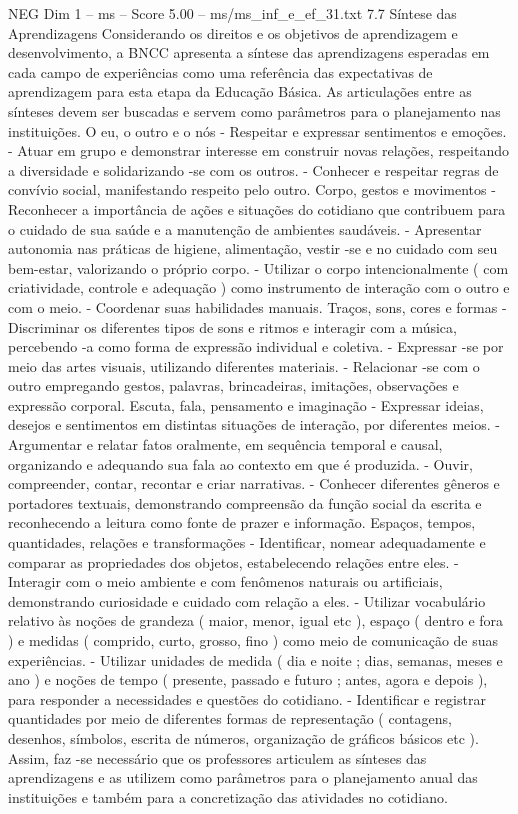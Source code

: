 \begin{textsample}{NEG Dim 1 – ms – Score 5.00 – ms/ms\_inf\_e\_ef\_31.txt}  \label{ex:f1_neg_107}
7.7 Síntese das Aprendizagens Considerando os direitos e os objetivos de aprendizagem e desenvolvimento, a BNCC apresenta a síntese das aprendizagens esperadas em cada campo de experiências como uma referência das expectativas de aprendizagem para esta etapa da Educação Básica.
As articulações entre as sínteses devem ser buscadas e servem como parâmetros para o planejamento nas instituições.
O eu, o outro e o nós - Respeitar e expressar sentimentos e emoções. - Atuar em grupo e demonstrar interesse em construir novas relações, respeitando a diversidade e solidarizando -se com os outros. - Conhecer e respeitar regras de convívio social, manifestando respeito pelo outro.
Corpo, gestos e movimentos - Reconhecer a importância de ações e situações do cotidiano que contribuem para o cuidado de sua saúde e a manutenção de ambientes saudáveis. - Apresentar autonomia nas práticas de higiene, alimentação, vestir -se e no cuidado com seu bem-estar, valorizando o próprio corpo. - Utilizar o corpo intencionalmente ( com criatividade, controle e adequação ) como instrumento de interação com o outro e com o meio. - Coordenar suas habilidades manuais.
Traços, sons, cores e formas - Discriminar os diferentes tipos de sons e ritmos e interagir com a música, percebendo -a como forma de expressão individual e coletiva. - Expressar -se por meio das artes visuais, utilizando diferentes materiais. - Relacionar -se com o outro empregando gestos, palavras, brincadeiras, imitações, observações e expressão corporal.
Escuta, fala, pensamento e imaginação - Expressar ideias, desejos e sentimentos em distintas situações de interação, por diferentes meios. - Argumentar e relatar fatos oralmente, em sequência temporal e causal, organizando e adequando sua fala ao contexto em que é produzida. - Ouvir, compreender, contar, recontar e criar narrativas. - Conhecer diferentes gêneros e portadores textuais, demonstrando compreensão da função social da escrita e reconhecendo a leitura como fonte de prazer e informação.
Espaços, tempos, quantidades, relações e transformações - Identificar, nomear adequadamente e comparar as propriedades dos objetos, estabelecendo relações entre eles. - Interagir com o meio ambiente e com fenômenos naturais ou artificiais, demonstrando curiosidade e cuidado com relação a eles. - Utilizar vocabulário relativo às noções de grandeza ( maior, menor, igual etc ), espaço ( dentro e fora ) e medidas ( comprido, curto, grosso, fino ) como meio de comunicação de suas experiências. - Utilizar unidades de medida ( dia e noite ; dias, semanas, meses e ano ) e noções de tempo ( presente, passado e futuro ; antes, agora e depois ), para responder a necessidades e questões do cotidiano. - Identificar e registrar quantidades por meio de diferentes formas de representação ( contagens, desenhos, símbolos, escrita de números, organização de gráficos básicos etc ).
Assim, faz -se necessário que os professores articulem as sínteses das aprendizagens e as utilizem como parâmetros para o planejamento anual das instituições e também para a concretização das atividades no cotidiano.

\end{textsample}
